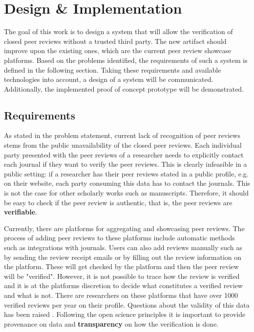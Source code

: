 
\chapter{Design \& Implementation}\label{chapter:design}

The goal of this work is to design a system that will allow the verification of closed peer reviews without a trusted third party. The new artifact should improve upon the existing ones, which are the current peer review showcase platforms. Based on the problems identified, the requirements of such a system is defined in the following section. Taking these requirements and available technologies into account, a design of a system will be communicated. Additionally, the implemented proof of concept prototype will be demonstrated.

\section{Requirements} \label{sec:requirements}

As stated in the problem statement, current lack of recognition of peer reviews stems from the public unavailability of the closed peer reviews. Each individual party presented with the peer reviews of a researcher needs to explicitly contact each journal if they want to verify the peer reviews. This is clearly infeasible in a public setting: if a researcher has their peer reviews stated in a public profile, e.g. on their website, each party consuming this data has to contact the journals. This is not the case for other scholarly works such as manuscripts. Therefore, it should be easy to check if the peer review is authentic, that is, the peer reviews are \textbf{verifiable}.

Currently, there are platforms for aggregating and showcasing peer reviews. The process of adding peer reviews to these platforms include automatic methods such as integrations with journals. Users can also add reviews manually such as by sending the review receipt emails or by filling out the review information on the platform. These will get checked by the platform and then the peer review will be "verified". However, it is not possible to trace how the review is verified and it is at the platforms discretion to decide what constitutes a verified review and what is not. There are researchers on these platforms that have over 1000 verified reviews per year on their profile. Questions about the validity of this data has been raised \parencite{TeixeiradaSilva.2020, TeixeiradaSilva.2017, TeixeiradaSilva.2019}. Following the open science principles it is important to provide provenance on data and \textbf{transparency} on how the verification is done.


